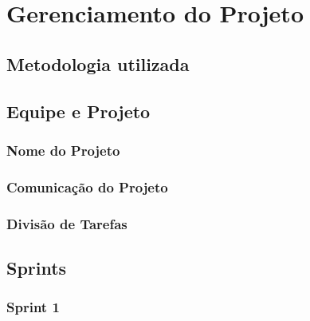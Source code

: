 \chapter{Gerenciamento do Projeto}

	\section{Metodologia utilizada}
	\section{Equipe e Projeto}
	\subsection{Nome do Projeto}
	\subsection{Comunicação do Projeto}
	\subsection{Divisão de Tarefas}
	\section{Sprints}
	\subsection{Sprint 1}